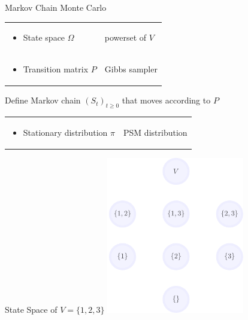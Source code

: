 \documentclass[mathserif]{beamer}
\begin{document}
\begin{frame}{Markov Chain Monte Carlo}
\begin{tabular}{*{2}{@{}l}}
\begin{minipage}{0.45\textwidth}
\begin{itemize}
\item State space $\Omega$
\end{itemize}
\end{minipage} & \color{col1}powerset of $V$\\[1em]
\begin{minipage}{0.45\textwidth}
\begin{itemize}
\item Transition matrix $P$
\end{itemize}
\end{minipage} & \color{col1}Gibbs sampler
\end{tabular}

\vspace{3em}
Define Markov chain $\left(S_t\right)_{t \geq 0}$ that moves according to $P$

\vspace{2em}
\begin{tabular}{*{2}{@{}l}}
\begin{minipage}{0.45\textwidth}
\begin{itemize}
\item Stationary distribution $\pi$
\end{itemize}
\end{minipage} & \color{col1}PSM distribution
\end{tabular}
\end{frame}

\begin{frame}{State Space of $V = \{1, 2, 3\}$}
\vspace{1em}
\centering
\includegraphics[height=2.7in]{figures/lattice_nodes_only.pdf}
\end{frame}
\end{document}
